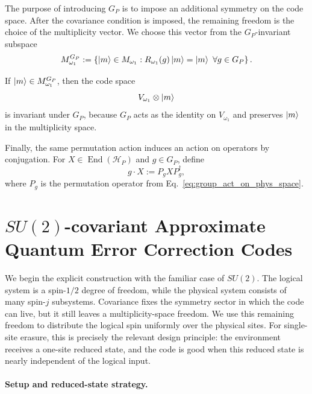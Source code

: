 \documentclass[10pt,twocolumn,superscriptaddress,aps,amsmath,amssymb,citeautoscript,floatfix,prx,longbibliography]{revtex4-2}
\theoremstyle{plain}
\theoremstyle{plain}
\theoremstyle{plain}
\theoremstyle{plain}
\theoremstyle{plain}
\theoremstyle{plain}
\begin{document}
The purpose of introducing $G_P$ is to impose an additional symmetry on the code space. After the covariance condition is imposed, the remaining freedom is the choice of the multiplicity vector. We choose this vector from the $G_P$-invariant subspace
\begin{equation}\label{eq:g_inv_subspace}
M_{\omega_1}^{G_P}
:=
\left\{
    \ket m\in M_{\omega_1}
    :
    R_{\omega_1}(g)\ket m=\ket m
    \ \forall g\in G_P
\right\}.
\end{equation}

If $\ket m\in M_{\omega_1}^{G_P}$, then the code space
$$
V_{\omega_1}\otimes\ket m
$$
is invariant under $G_P$, because $G_P$ acts as the identity on $V_{\omega_1}$ and preserves $\ket m$ in the multiplicity space.

Finally, the same permutation action induces an action on operators by conjugation. For $X\in\operatorname{End}(\mathcal H_P)$ and $g\in G_P$, define
\begin{equation}\label{eq:group_act_oper}
g\cdot X
:=
P_gXP_g^\dagger,
\end{equation}
where $P_g$ is the permutation operator from Eq.~\eqref{eq:group_act_on_phys_space}.


\section{\texorpdfstring{$SU(2)$}{SU(2)}-covariant Approximate Quantum Error Correction Codes}\label{sec:main_su2}

We begin the explicit construction with the familiar case of $SU(2)$. The logical system is a spin-$1/2$ degree of freedom, while the physical system consists of many spin-$j$ subsystems. Covariance fixes the symmetry sector in which the code can live, but it still leaves a multiplicity-space freedom. We use this remaining freedom to distribute the logical spin uniformly over the physical sites. For single-site erasure, this is precisely the relevant design principle: the environment receives a one-site reduced state, and the code is good when this reduced state is nearly independent of the logical input.

\paragraph{Setup and reduced-state strategy.}
\end{document}
